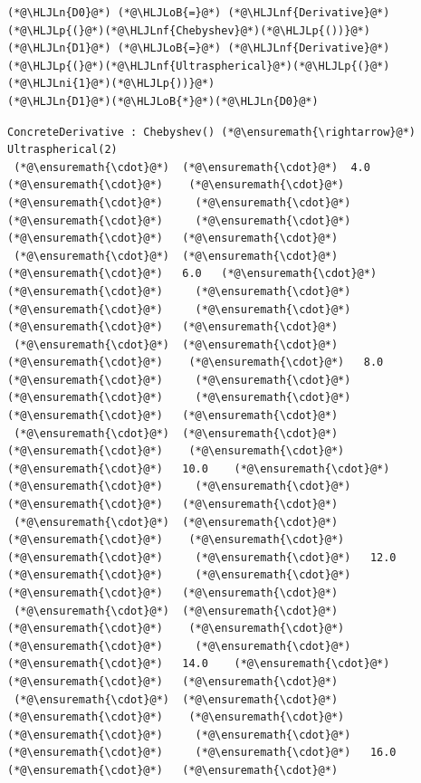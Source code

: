 \documentclass[12pt,a4paper]{article}
\newcommand{\HLJLn}[1]{#1}
\newcommand{\HLJLnf}[1]{\textcolor[RGB]{66,102,213}{#1}}
\newcommand{\HLJLni}[1]{\textcolor[RGB]{59,151,46}{#1}}
\newcommand{\HLJLoB}[1]{\textcolor[RGB]{102,102,102}{\textbf{#1}}}
\newcommand{\HLJLp}[1]{#1}
\begin{document}
\begin{lstlisting}
(*@\HLJLn{D0}@*) (*@\HLJLoB{=}@*) (*@\HLJLnf{Derivative}@*)(*@\HLJLp{(}@*)(*@\HLJLnf{Chebyshev}@*)(*@\HLJLp{())}@*)
(*@\HLJLn{D1}@*) (*@\HLJLoB{=}@*) (*@\HLJLnf{Derivative}@*)(*@\HLJLp{(}@*)(*@\HLJLnf{Ultraspherical}@*)(*@\HLJLp{(}@*)(*@\HLJLni{1}@*)(*@\HLJLp{))}@*)
(*@\HLJLn{D1}@*)(*@\HLJLoB{*}@*)(*@\HLJLn{D0}@*)
\end{lstlisting}

\begin{lstlisting}
ConcreteDerivative : Chebyshev() (*@\ensuremath{\rightarrow}@*) Ultraspherical(2)
 (*@\ensuremath{\cdot}@*)  (*@\ensuremath{\cdot}@*)  4.0   (*@\ensuremath{\cdot}@*)    (*@\ensuremath{\cdot}@*)     (*@\ensuremath{\cdot}@*)     (*@\ensuremath{\cdot}@*)     (*@\ensuremath{\cdot}@*)     (*@\ensuremath{\cdot}@*)     (*@\ensuremath{\cdot}@*)   (*@\ensuremath{\cdot}@*)
 (*@\ensuremath{\cdot}@*)  (*@\ensuremath{\cdot}@*)   (*@\ensuremath{\cdot}@*)   6.0   (*@\ensuremath{\cdot}@*)     (*@\ensuremath{\cdot}@*)     (*@\ensuremath{\cdot}@*)     (*@\ensuremath{\cdot}@*)     (*@\ensuremath{\cdot}@*)     (*@\ensuremath{\cdot}@*)   (*@\ensuremath{\cdot}@*)
 (*@\ensuremath{\cdot}@*)  (*@\ensuremath{\cdot}@*)   (*@\ensuremath{\cdot}@*)    (*@\ensuremath{\cdot}@*)   8.0    (*@\ensuremath{\cdot}@*)     (*@\ensuremath{\cdot}@*)     (*@\ensuremath{\cdot}@*)     (*@\ensuremath{\cdot}@*)     (*@\ensuremath{\cdot}@*)   (*@\ensuremath{\cdot}@*)
 (*@\ensuremath{\cdot}@*)  (*@\ensuremath{\cdot}@*)   (*@\ensuremath{\cdot}@*)    (*@\ensuremath{\cdot}@*)    (*@\ensuremath{\cdot}@*)   10.0    (*@\ensuremath{\cdot}@*)     (*@\ensuremath{\cdot}@*)     (*@\ensuremath{\cdot}@*)     (*@\ensuremath{\cdot}@*)   (*@\ensuremath{\cdot}@*)
 (*@\ensuremath{\cdot}@*)  (*@\ensuremath{\cdot}@*)   (*@\ensuremath{\cdot}@*)    (*@\ensuremath{\cdot}@*)    (*@\ensuremath{\cdot}@*)     (*@\ensuremath{\cdot}@*)   12.0    (*@\ensuremath{\cdot}@*)     (*@\ensuremath{\cdot}@*)     (*@\ensuremath{\cdot}@*)   (*@\ensuremath{\cdot}@*)
 (*@\ensuremath{\cdot}@*)  (*@\ensuremath{\cdot}@*)   (*@\ensuremath{\cdot}@*)    (*@\ensuremath{\cdot}@*)    (*@\ensuremath{\cdot}@*)     (*@\ensuremath{\cdot}@*)     (*@\ensuremath{\cdot}@*)   14.0    (*@\ensuremath{\cdot}@*)     (*@\ensuremath{\cdot}@*)   (*@\ensuremath{\cdot}@*)
 (*@\ensuremath{\cdot}@*)  (*@\ensuremath{\cdot}@*)   (*@\ensuremath{\cdot}@*)    (*@\ensuremath{\cdot}@*)    (*@\ensuremath{\cdot}@*)     (*@\ensuremath{\cdot}@*)     (*@\ensuremath{\cdot}@*)     (*@\ensuremath{\cdot}@*)   16.0    (*@\ensuremath{\cdot}@*)   (*@\ensuremath{\cdot}@*)

\end{lstlisting}
\end{document}
